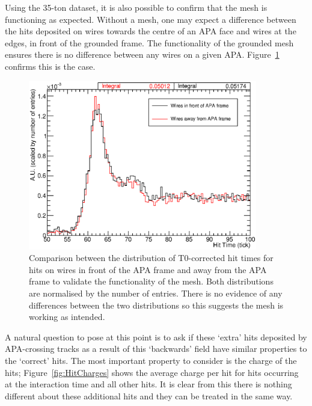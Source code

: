 Using the 35-ton dataset, it is also possible to confirm that the mesh is functioning as expected.  Without a mesh, one may expect a difference between the hits deposited on wires towards the centre of an APA face and wires at the edges, in front of the grounded frame.  The functionality of the grounded mesh ensures there is no difference between any wires on a given APA.  Figure~\ref{fig:HitTimesFrame} confirms this is the case.

\begin{figure}
  \centering
  \includegraphics[width=10cm]{HitTimesFrame.eps}
  \caption[Comparison between the distribution of T0-corrected hit times for hits on wires in front of the APA frame and away from the APA frame to validate the functionality of the mesh.]{Comparison between the distribution of T0-corrected hit times for hits on wires in front of the APA frame and away from the APA frame to validate the functionality of the mesh.  Both distributions are normalised by the number of entries.  There is no evidence of any differences between the two distributions so this suggests the mesh is working as intended.}
  \label{fig:HitTimesFrame}
\end{figure}

A natural question to pose at this point is to ask if these `extra' hits deposited by APA-crossing tracks as a result of this `backwards' field have similar properties to the `correct' hits.  The most important property to consider is the charge of the hits; Figure~\ref{fig:HitCharges} shows the average charge per hit for hits occurring at the interaction time and all other hits.  It is clear from this there is nothing different about these additional hits and they can be treated in the same way.

